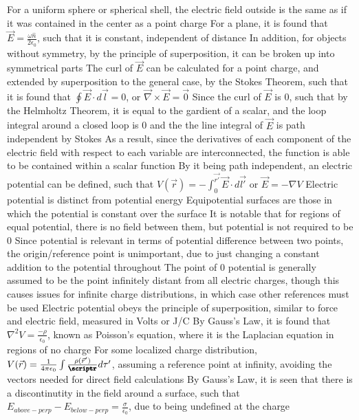 \documentclass[11 pt, twoside]{article}
\newenvironment{outline*}
{
	\begin{outline}[enumerate]
	}
	{\end{outline}
}
\begin{document}
\begin{outline*}
		\3 For a uniform sphere or spherical shell, the electric field outside is the same as if it was contained in the center as a point charge
		\3 For a plane, it is found that $\vec{E} = \frac{\omega \hat{n}}{2\epsilon_0}$, such that it is constant, independent of distance
		\3 In addition, for objects without symmetry, by the principle of superposition, it can be broken up into symmetrical parts
	\2 The curl of $\vec{E}$ can be calculated for a point charge, and extended by superposition to the general case, by the Stokes Theorem, such that it is found that $\oint \vec{E} \cdot d\vec{l} = 0$, or $\vec{\nabla} \times \vec{E} = \vec{0}$
\1 Since the curl of $\vec{E}$ is 0, such that by the Helmholtz Theorem, it is equal to the gardient of a scalar, and the loop integral around a closed loop is 0 and the the line integral of $\vec{E}$ is path independent by Stokes
	\2 As a result, since the derivatives of each component of the electric field with respect to each variable are interconnected, the function is able to be contained within a scalar function
	\2 By it being path independent, an electric potential can be defined, such that $V(\vec{r}) = -\int^{\vec{r'}}_0 \vec{E} \cdot d\vec{l'}$ or $\vec{E} = -\nabla V$
		\3 Electric potential is distinct from potential energy
		\3 Equipotential surfaces are those in which the potential is constant over the surface
			\4 It is notable that for regions of equal potential, there is no field between them, but potential is not required to be 0
		\3 Since potential is relevant in terms of potential difference between two points, the origin/reference point is unimportant, due to just changing a constant addition to the potential throughout
			\4 The point of 0 potential is generally assumed to be the point infinitely distant from all electric charges, though this causes issues for infinite charge distributions, in which case other references must be used
	\2 Electric potential obeys the principle of superposition, similar to force and electric field, measured in Volts or J/C
	\2 By Gauss's Law, it is found that $\nabla^2 V = \frac{-\rho}{\epsilon_0}$, known as Poisson's equation, where it is the Laplacian equation in regions of no charge
		\3 For some localized charge distribution, $V(\vec{r}) = \frac{1}{4\pi\epsilon_0} \int \frac{\rho(\vec{r}')}{\pmb{\scriptr}}d\tau'$, assuming a reference point at infinity, avoiding the vectors needed for direct field calculations
\1 By Gauss's Law, it is seen that there is a discontinutity in the field around a surface, such that $E_{above-perp} - E_{below-perp} = \frac{\sigma}{\epsilon_0}$, due to being undefined at the charge

\end{outline*}
\end{document}
